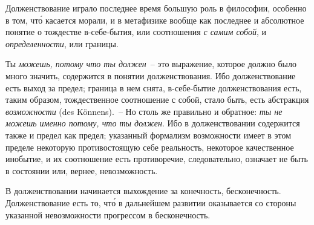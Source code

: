 Долженствование играло последнее время большую
роль в философии, особенно в том, чт\'о касается морали,
и в метафизике вообще как последнее и абсолютное понятие
о тождестве в-себе-бытия, или соотношения \emph{с самим
собой}, и \emph{определенности}, или границы.

Ты \emph{можешь, потому что ты должен}\endnotemark{}~-- это выражение,
которое должно было много значить, содержится в
понятии долженствования. Ибо долженствование есть выход
за предел; граница в нем снята, в-себе-бытие долженствования
есть, таким образом, тождественное соотношение
с собой, стало быть, есть абстракция \emph{возможности}
(des Könnens).~-- Но столь же правильно и обратное: \emph{ты
не можешь именно потому, что ты должен}. Ибо в долженствовании
содержится также и предел как предел; указанный
формализм возможности имеет в этом пределе некоторую
противостоящую себе реальность, некоторое качественное
инобытие, и их соотношение есть противоречие,
следовательно, означает не быть в состоянии или, вернее,
невозможность.


В долженствовании начинается выхождение за конечность,
бесконечность. Долженствование есть то, чт\'о в
дальнейшем развитии оказывается со стороны указанной
невозможности прогрессом в бесконечность.

